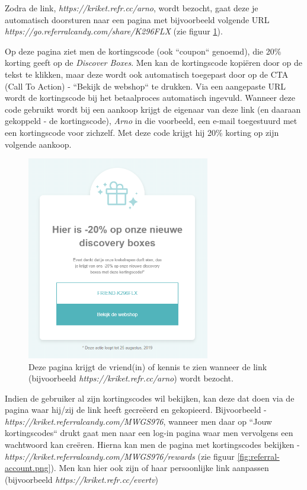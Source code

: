 Zodra de link, \emph{https://kriket.refr.cc/arno}, wordt bezocht, gaat deze je automatisch doorsturen naar een pagina met bijvoorbeeld volgende URL \emph{https://go.referralcandy.com/share/K296FLX} (zie figuur \ref{fig:referral-share-page}). 

Op deze pagina ziet men de kortingscode (ook ``coupon`` genoemd), die 20\% korting geeft op de \emph{Discover Boxes}. Men kan de kortingscode kopiëren door op de tekst te klikken, maar deze wordt ook automatisch toegepast door op de CTA (Call To Action) - ``Bekijk de webshop`` te drukken. Via een aangepaste URL wordt de kortingscode bij het betaalproces automatisch ingevuld. Wanneer deze code gebruikt wordt bij een aankoop krijgt de eigenaar van deze link (en daaraan gekoppeld - de kortingscode), \emph{Arno} in die voorbeeld, een e-mail toegestuurd met een kortingscode voor zichzelf. Met deze code krijgt hij 20\% korting op zijn volgende aankoop.

\begin{figure}[h!]
	\includegraphics[width=80mm,scale=0.7]{img/referral-share-page.png}
	\centering
	\caption{Deze pagina krijgt de vriend(in) of kennis te zien wanneer de link (bijvoorbeeld \emph{https://kriket.refr.cc/arno}) wordt bezocht.}
	\label{fig:referral-share-page}
\end{figure}

Indien de gebruiker al zijn kortingscodes wil bekijken, kan deze dat doen via de pagina waar hij/zij de link heeft gecreëerd en gekopieerd. Bijvoorbeeld - \emph{https://kriket.referralcandy.com/MWGS976}, wanneer men daar op ``Jouw kortingscodes`` drukt gaat men naar een log-in pagina waar men vervolgens een wachtwoord kan creëren. Hierna kan men de pagina met kortingscodes bekijken - \emph{https://kriket.referralcandy.com/MWGS976/rewards} (zie figuur \ref{fig:referral-account.png}). Men kan hier ook zijn of haar persoonlijke link aanpassen (bijvoorbeeld \emph{https://kriket.refr.cc/evertv})

